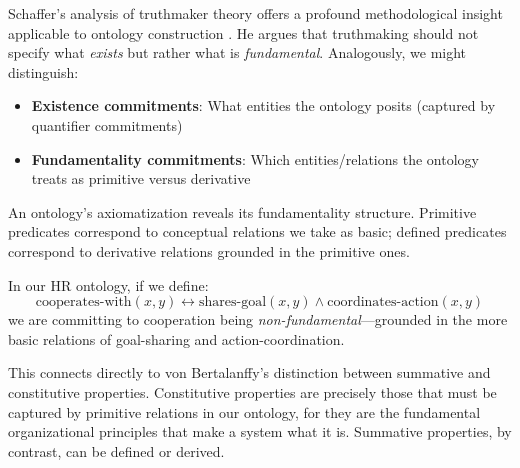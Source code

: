 Schaffer's analysis of truthmaker theory offers a profound methodological insight applicable to ontology construction \cite{Schaffer2008}. He argues that truthmaking should not specify what \emph{exists} but rather what is \emph{fundamental}. Analogously, we might distinguish:

\begin{itemize}
	\item \textbf{Existence commitments}: What entities the ontology posits (captured by quantifier commitments)
	\item \textbf{Fundamentality commitments}: Which entities/relations the ontology treats as primitive versus derivative
\end{itemize}

An ontology's axiomatization reveals its fundamentality structure. Primitive predicates correspond to conceptual relations we take as basic; defined predicates correspond to derivative relations grounded in the primitive ones.

In our HR ontology, if we define:
$$\text{cooperates-with}(x,y) \leftrightarrow \text{shares-goal}(x,y) \land \text{coordinates-action}(x,y)$$
we are committing to cooperation being \emph{non-fundamental}—grounded in the more basic relations of goal-sharing and action-coordination.

This connects directly to von Bertalanffy's distinction between summative and constitutive properties. Constitutive properties are precisely those that must be captured by primitive relations in our ontology, for they are the fundamental organizational principles that make a system what it is. Summative properties, by contrast, can be defined or derived.